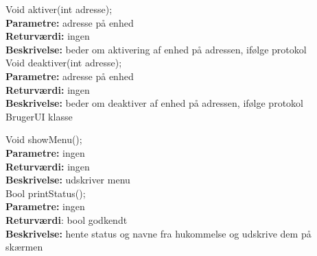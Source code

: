 Void aktiver(int adresse); \\
\textbf{Parametre:} adresse på enhed \\
\textbf{Returværdi:} ingen \\
\textbf{Beskrivelse:} beder om aktivering af enhed på adressen, ifølge protokol \\

Void deaktiver(int adresse); \\
\textbf{Parametre:} adresse på enhed \\
\textbf{Returværdi:} ingen \\
\textbf{Beskrivelse:} beder om deaktiver af enhed på adressen, ifølge protokol \\

{\centering BrugerUI klasse}

Void showMenu(); \\
\textbf{Parametre:} ingen \\
\textbf{Returværdi:} ingen \\
\textbf{Beskrivelse:} udskriver menu \\

Bool printStatus(); \\
\textbf{Parametre:} ingen \\
\textbf{Returværdi}: bool godkendt \\
\textbf{Beskrivelse:} hente status og navne fra hukommelse og udskrive dem på skærmen \\












